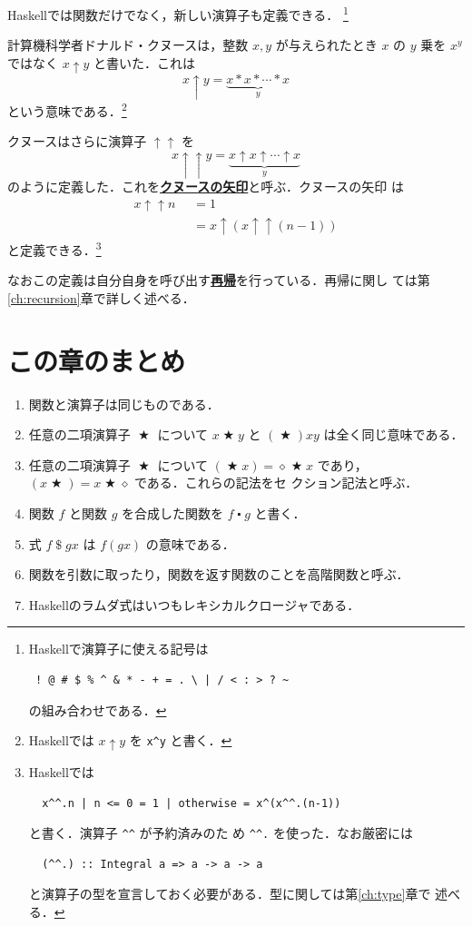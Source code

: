 \documentclass[a5paper,twoside,fleqn,draft]{jsbook}
\newcommand{\programminglanguage}[1]{\textsf{#1}}
\newcommand{\haskell}{\programminglanguage{Haskell}}
\newcommand{\keyword}[1]{{\underline{\textbf{#1}}}}
\newcommand{\code}[1]{\texttt{#1}}
\newcommand{\mKeyword}[1]{\mathsf{#1}}
\newcommand{\mOtherwiseKeyword}{\mKeyword{otherwise}}
\DeclareMathOperator{\mOtherwise}{\mOtherwiseKeyword}
\newcommand{\mAnonParam}{\diamond}
\DeclareMathOperator{\mApply}{\$}
\DeclareMathOperator{\mBinOp}{\bigstar}
\DeclareMathOperator{\mComp}{\centerdot}
\newcommand{\mGuard}[1]{\mathop{\mid_{#1}}}
\begin{document}
\haskell では関数だけでなく，新しい演算子も定義できる．
\footnote{\haskell で演算子に使える記号は
\begin{verbatim}
 ! @ # $ % ^ & * - + = . \ | / < : > ? ~
\end{verbatim}%
の組み合わせである．}


計算機科学者ドナルド・クヌースは，整数 $x,y$ が与えられたとき $x$ の
$y$ 乗を $x^y$ ではなく $x\uparrow y$ と書いた．これは
\begin{equation}
  x\uparrow y
  =\underbrace{x*x*\dotsb*x}_{y}
\end{equation}
という意味である．\footnote{\haskell では $x\uparrow y$ を
  \code{x\textasciicircum y} と書く．}

クヌースはさらに演算子 $\uparrow\uparrow$ を
\begin{equation}
  x\uparrow\uparrow y
  =\underbrace{x\uparrow x\uparrow\dotsb\uparrow x}_{y}
\end{equation}
のように定義した．これを\keyword{クヌースの矢印}と呼ぶ．クヌースの矢印
は
\begin{align}
  x\uparrow\uparrow n
  &\mGuard{n\le0}=1\\
  &\mGuard{\mOtherwise}
  =x\uparrow(x\uparrow\uparrow(n-1))
\end{align}
と定義できる．\footnote{\haskell では
\begin{verbatim}
  x^^.n | n <= 0 = 1 | otherwise = x^(x^^.(n-1))
\end{verbatim}
と書く．演算子 \code{\textasciicircum\textasciicircum} が予約済みのた
め \code{\textasciicircum\textasciicircum.} を使った．なお厳密には
\begin{verbatim}
  (^^.) :: Integral a => a -> a -> a
\end{verbatim}
と演算子の型を宣言しておく必要がある．型に関しては第\ref{ch:type}章で
述べる．}

なおこの定義は自分自身を呼び出す\keyword{再帰}を行っている．再帰に関し
ては第\ref{ch:recursion}章で詳しく述べる．

\section{この章のまとめ}

\begin{enumerate}
\item 関数と演算子は同じものである．\item 任意の二項演算子 $\mBinOp$
  について $x\mBinOp y$ と $(\mBinOp)xy$ は全く同じ意味である．\item
  任意の二項演算子 $\mBinOp$ について $(\mBinOp x)=\mAnonParam\mBinOp
  x$ であり，$(x\mBinOp)=x\mBinOp\mAnonParam$ である．これらの記法をセ
  クション記法と呼ぶ．\item 関数 $f$ と関数 $g$ を合成した関数を
  $f\mComp g$ と書く．\item 式 $f\mApply gx$ は $f(gx)$ の意味である．
\item 関数を引数に取ったり，関数を返す関数のことを高階関数と呼ぶ．
\item \haskell のラムダ式はいつもレキシカルクロージャである．
\end{enumerate}
\end{document}
